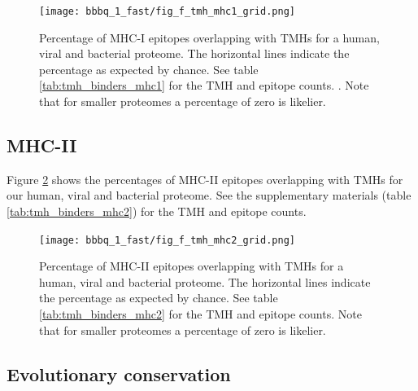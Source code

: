 
\begin{figure}[!htbp]
  \texttt{[image: bbbq\_1\_fast/fig\_f\_tmh\_mhc1\_grid.png]}
  \caption{
    Percentage of MHC-I epitopes overlapping with TMHs
    for a human, viral and bacterial proteome.
    The horizontal lines indicate the percentage as expected by chance.
    See table \ref{tab:tmh_binders_mhc1} for the TMH and epitope counts.
    .
    Note that for smaller proteomes a percentage of zero is likelier.
  }
  \label{fig:1}
\end{figure}

\subsection{MHC-II}

Figure \ref{fig:2} shows the percentages of MHC-II epitopes overlapping 
with TMHs for our human, viral and bacterial proteome.
See the supplementary materials (table \ref{tab:tmh_binders_mhc2}) 
for the TMH and epitope counts.

\begin{figure}[!htbp]
  \texttt{[image: bbbq\_1\_fast/fig\_f\_tmh\_mhc2\_grid.png]}
  \caption{
    Percentage of MHC-II epitopes overlapping with TMHs
    for a human, viral and bacterial proteome.
    The horizontal lines indicate the percentage as expected by chance.
    See table \ref{tab:tmh_binders_mhc2} for the TMH and epitope counts.
    Note that for smaller proteomes a percentage of zero is likelier.
  }
  \label{fig:2}
\end{figure}

\subsection{Evolutionary conservation}

